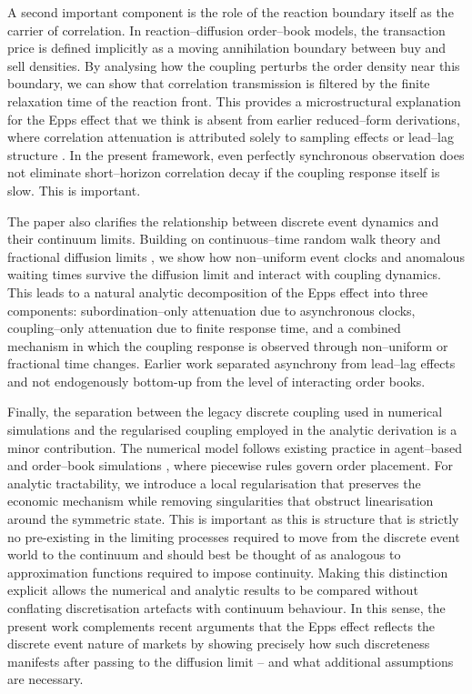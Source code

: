 \documentclass[5p,final]{elsarticle}
\begin{document}
A second important component is the role of the reaction boundary itself as the carrier of correlation. In reaction--diffusion order--book models, the transaction price is defined implicitly as a moving annihilation boundary between buy and sell densities. By analysing how the coupling perturbs the order density near this boundary, we can show that correlation transmission is filtered by the finite relaxation time of the reaction front. This provides a microstructural explanation for the Epps effect that we think is absent from earlier reduced--form derivations, where correlation attenuation is attributed solely to sampling effects or lead--lag structure \citep{toth2009,chang2021}. In the present framework, even perfectly synchronous observation does not eliminate short--horizon correlation decay if the coupling response itself is slow. This is important. 

The paper also clarifies the relationship between discrete event dynamics and their continuum limits. Building on continuous--time random walk theory and fractional diffusion limits \citep{montroll1965,scalas2006,angstmann2016}, we show how non--uniform event clocks and anomalous waiting times survive the diffusion limit and interact with coupling dynamics. This leads to a natural analytic decomposition of the Epps effect into three components: subordination--only attenuation due to asynchronous clocks, coupling--only attenuation due to finite response time, and a combined mechanism in which the coupling response is observed through non--uniform or fractional time changes. Earlier work separated asynchrony from lead--lag effects \citep{mastromatteo2011} and not endogenously bottom-up from the level of interacting order books.

Finally, the separation between the legacy discrete coupling used in numerical simulations and the regularised coupling employed in the analytic derivation is a minor contribution. The numerical model follows existing practice in agent--based \cite{dicksetal2024}  and order--book simulations \cite{DianaGebbie2025}, where piecewise rules govern order placement. For analytic tractability, we introduce a local regularisation that preserves the economic mechanism while removing singularities that obstruct linearisation around the symmetric state. This is important as this is structure that is strictly no pre-existing in the limiting processes required to move from the discrete event world to the continuum and should best be thought of as analogous to approximation functions required to impose continuity. Making this distinction explicit allows the numerical and analytic results to be compared without conflating discretisation artefacts with continuum behaviour. In this sense, the present work complements recent arguments that the Epps effect reflects the discrete event nature of markets \citep{chang2025discrete} by showing precisely how such discreteness manifests after passing to the diffusion limit -- and what additional assumptions are necessary. 
\end{document}
